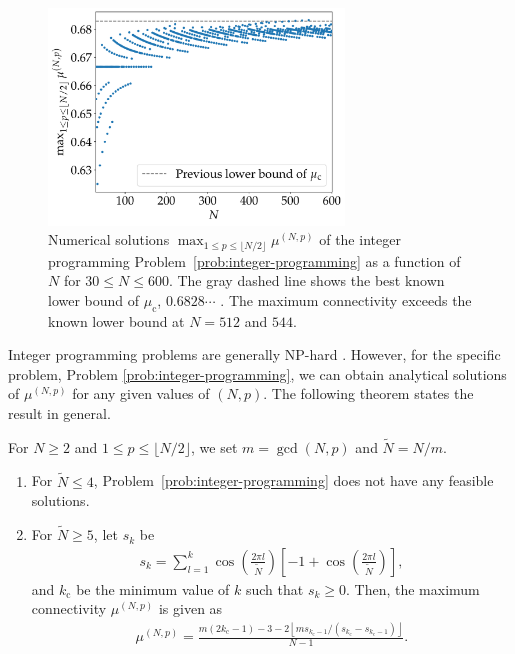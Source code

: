 \begin{figure}[!t]
    \centering
    \includegraphics[width=0.7\textwidth]{figs/max_connect.pdf}
    \caption{
    Numerical solutions $\max_{1\leq p \leq \lfloor N/2\rfloor}\mu^{(N,p)}$ of the integer programming Problem~\ref{prob:integer-programming} as a function of $N$ for $30\leq N\leq 600$. The gray dashed line shows the best known lower bound of $\mu_{\mathrm{c}}$, $0.6828\cdots$ \cite{townsend2020}. The maximum connectivity exceeds the known lower bound at $N=512$ and $544$.
    }
    \label{fig:max_connect}
\end{figure}

Integer programming problems are generally NP-hard \cite{Conforti2014}. However, for the specific problem, Problem \ref{prob:integer-programming}, we can obtain analytical solutions of $\mu^{(N,p)}$ for any given values of $(N,p)$. The following theorem states the result in general.
\begin{theorem}
\label{th:maxmu}
For $N\geq2$ and $1\leq p\leq\lfloor N/2\rfloor$, we set $m=\gcd(N,p)$
and $\widetilde{N}=N/m$.
\begin{enumerate}
    \item For $\widetilde{N}\leq 4$, Problem~\ref{prob:integer-programming} does not have any feasible solutions.
    \item For $\widetilde{N}\geq5$, let $s_{k}$ be
    \begin{align}
        s_{k}=\sum_{l=1}^{k}\cos\left(\frac{2\pi l}{\widetilde{N}}\right)\left[-1+\cos\left(\frac{2\pi l}{\widetilde{N}}\right)\right],
    \end{align}
    and $k_{\mathrm{c}}$ be the minimum value of $k$ such that $s_{k}\geq0$.
    Then, the maximum connectivity $\mu^{(N,p)}$ is given as
    \begin{align}
        \mu^{(N,p)} = \frac{m(2k_{\mathrm{c}}-1)-3-2\left\lfloor ms_{k_{\mathrm{c}}-1}/(s_{k_{\mathrm{c}}}-s_{k_{\mathrm{c}}-1})\right\rfloor}{N-1}.     \label{eq:mu_N_p}
    \end{align}
\end{enumerate}
\end{theorem}

